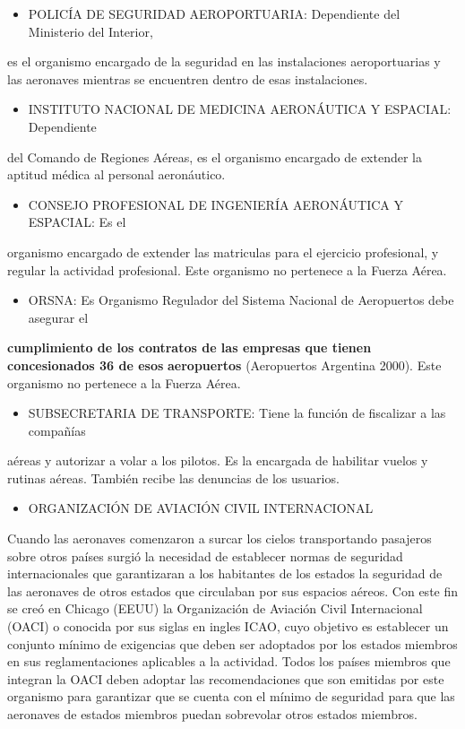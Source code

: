 \begin{itemize}
  \item POLICÍA DE SEGURIDAD AEROPORTUARIA: Dependiente del Ministerio del Interior,
\end{itemize}
es el organismo encargado de la seguridad en las instalaciones aeroportuarias y las aeronaves mientras se encuentren dentro de esas instalaciones.

\begin{itemize}
  \item INSTITUTO NACIONAL DE MEDICINA AERONÁUTICA Y ESPACIAL: Dependiente
\end{itemize}
del Comando de Regiones Aéreas, es el organismo encargado de extender la aptitud médica al personal aeronáutico.

\begin{itemize}
  \item CONSEJO PROFESIONAL DE INGENIERÍA AERONÁUTICA Y ESPACIAL: Es el
\end{itemize}
organismo encargado de extender las matriculas para el ejercicio profesional, y regular la actividad profesional. Este organismo no pertenece a la Fuerza Aérea.

\begin{itemize}
  \item ORSNA: Es Organismo Regulador del Sistema Nacional de Aeropuertos debe asegurar el
\end{itemize}
\textbf{cumplimiento de los contratos de las empresas que tienen concesionados 36 de esos} \textbf{aeropuertos }(Aeropuertos Argentina 2000). Este organismo no pertenece a la Fuerza Aérea.

\begin{itemize}
  \item SUBSECRETARIA DE TRANSPORTE: Tiene la función de fiscalizar a las compañías
\end{itemize}
aéreas y autorizar a volar a los pilotos. Es la encargada de habilitar vuelos y rutinas aéreas. También recibe las denuncias de los usuarios.

\begin{itemize}
  \item ORGANIZACIÓN DE AVIACIÓN CIVIL INTERNACIONAL
\end{itemize}
Cuando las aeronaves comenzaron a surcar los cielos transportando pasajeros sobre otros países surgió la necesidad de establecer normas de seguridad internacionales que garantizaran a los habitantes de los estados la seguridad de las aeronaves de otros estados que circulaban por sus espacios aéreos. Con este fin se creó en Chicago (EEUU) la Organización de Aviación Civil Internacional (OACI) o conocida por sus siglas en ingles ICAO, cuyo objetivo es establecer un conjunto mínimo de exigencias que deben ser adoptados por los estados miembros en sus reglamentaciones aplicables a la actividad. Todos los países miembros que integran la OACI deben adoptar las recomendaciones que son emitidas por este organismo para garantizar que se cuenta con el mínimo de seguridad para que las aeronaves de estados miembros puedan sobrevolar otros estados miembros.

